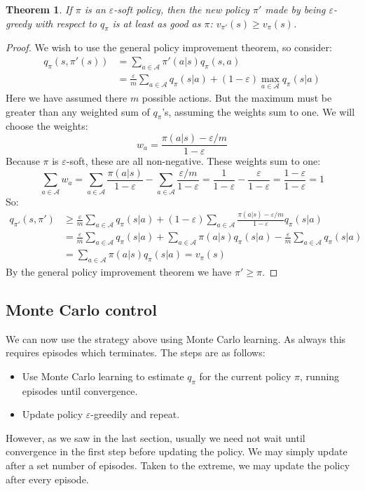 \documentclass[12pt, a4paper]{article}
\newtheorem{theorem}{Theorem}[section]
\numberwithin{equation}{section}
\begin{document}
\begin{theorem}
If $\pi$ is an $\varepsilon$-soft policy, then the new policy $\pi'$ made by being $\varepsilon$-greedy with respect to $q_\pi$ is at least as good as $\pi$: $v_{\pi'}(s)\ge v_\pi(s)$.
\end{theorem}
\begin{proof}
We wish to use the general policy improvement theorem, so consider:
\begin{align}
q_\pi(s,\pi'(s))&=\sum_{a\in\mathcal{A}}\pi'(a|s)q_\pi(s,a)\\
&=\frac{\varepsilon}{m}\sum_{a\in\mathcal{A}}q_\pi(s|a)+(1-\varepsilon)\max_{a\in\mathcal{A}}q_\pi(s|a)
\end{align}
Here we have assumed there $m$ possible actions. But the maximum must be greater than any weighted sum of $q_\pi$'s, assuming the weights sum to one. We will choose the weights:
\begin{equation}
w_a=\frac{\pi(a|s)-\varepsilon/m}{1-\varepsilon}
\end{equation}
Because $\pi$ is $\varepsilon$-soft, these are all non-negative. These weights sum to one:
\begin{equation}
\sum_{a\in\mathcal{A}}w_a=\sum_{a\in\mathcal{A}}\frac{\pi(a|s)}{1-\varepsilon}-\sum_{a\in\mathcal{A}}\frac{\varepsilon/m}{1-\varepsilon}=\frac{1}{1-\varepsilon}-\frac{\varepsilon}{1-\varepsilon}=\frac{1-\varepsilon}{1-\varepsilon}=1
\end{equation}
So:
\begin{align}
q_{\pi'}(s,\pi')&\ge\frac{\varepsilon}{m}\sum_{a\in\mathcal{A}}q_\pi(s|a)+(1-\varepsilon)\sum_{a\in\mathcal{A}}\frac{\pi(a|s)-\varepsilon/m}{1-\varepsilon}q_\pi(s|a)\\
&=\frac{\varepsilon}{m}\sum_{a\in\mathcal{A}}q_\pi(s|a)+\sum_{a\in\mathcal{A}}\pi(a|s)q_\pi(s|a)-\frac{\varepsilon}{m}\sum_{a\in\mathcal{A}}q_\pi(s|a)\\
&=\sum_{a\in\mathcal{A}}\pi(a|s)q_\pi(s|a)=v_\pi(s)
\end{align}
By the general policy improvement theorem we have $\pi'\ge\pi$.
\end{proof}

\subsection{Monte Carlo control}
We can now use the strategy above using Monte Carlo learning. As always this requires episodes which terminates. The steps are as follows:
\begin{itemize}
\item Use Monte Carlo learning to estimate $q_\pi$ for the current policy $\pi$, running episodes until convergence.
\item Update policy $\varepsilon$-greedily and repeat.
\end{itemize}
However, as we saw in the last section, usually we need not wait until convergence in the first step before updating the policy. We may simply update after a set number of episodes. Taken to the extreme, we may update the policy after every episode.
\end{document}

